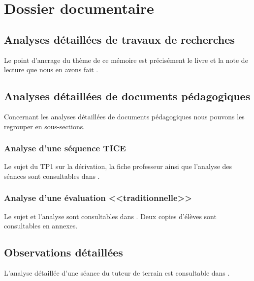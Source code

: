\chapter{Dossier documentaire}

\section{Analyses détaillées de travaux de recherches}

Le point d'ancrage du thème de ce mémoire est précisément le livre \cite{papert} et la note de lecture que nous en avons fait \cite{garnier3}.

\section{Analyses détaillées de documents pédagogiques}

Concernant les analyses détaillées de documents pédagogiques nous pouvons les regrouper en sous-sections.

\subsection{Analyse d'une séquence TICE}

Le sujet du TP1 sur la dérivation, la fiche professeur ainsi que l'analyse des séances sont consultables dans \cite{garnier2}.

\subsection{Analyse d'une évaluation <<traditionnelle>>}

Le sujet et l'analyse sont consultables dans \cite{garnier5}. Deux copies d'élèves sont consultables en annexes.

\section{Observations détaillées}

L'analyse détaillée d'une séance du tuteur de terrain est consultable dans \cite{garnier1}.